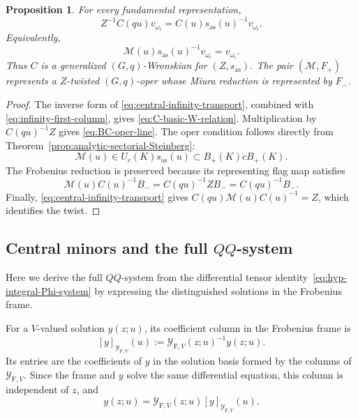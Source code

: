 \documentclass[11pt,leqno]{amsart}
\numberwithin{equation}{section}
\theoremstyle{plain}
\newtheorem{proposition}[theorem]{Proposition}
\theoremstyle{definition}
\theoremstyle{plain}
\theoremstyle{definition}
\theoremstyle{remark}
\begin{document}
\begin{proposition}\label{prop:one-step-differential-W}\label{prop:direct-qoper}
For every fundamental representation,
\begin{equation}\label{eq:C-basic-W-relation}
 Z^{-1}C(qu)v_{\omega_i}=C(u)s_{\mathrm{as}}(u)^{-1}v_{\omega_i}.
\end{equation}
Equivalently,
\begin{equation}\label{eq:BC-oper-line}
 \mathscr M(u)s_{\mathrm{as}}(u)^{-1}v_{\omega_i}=v_{\omega_i}.
\end{equation}
Thus $C$ is a generalized $(G,q)$-Wronskian for $(Z,s_{\mathrm{as}})$.  The pair $(\mathscr M,F_+)$ represents a $Z$-twisted $(G,q)$-oper whose Miura reduction is represented by $F_-$.
\end{proposition}
\begin{proof}
The inverse form of \eqref{eq:central-infinity-transport}, combined with \eqref{eq:infinity-first-column}, gives \eqref{eq:C-basic-W-relation}.  Multiplication by $C(qu)^{-1}Z$ gives \eqref{eq:BC-oper-line}.  The oper condition follows directly from Theorem~\ref{prop:analytic-sectorial-Steinberg}:
\[
 \mathscr M(u)\in U_c(K)s_{\mathrm{as}}(u)\subset B_+(K)\dot cB_+(K).
\]
The Frobenius reduction is preserved because its representing flag map satisfies
\[
 \mathscr M(u)C(u)^{-1}B_-=C(qu)^{-1}Z B_-=C(qu)^{-1}B_-.
\]
Finally, \eqref{eq:central-infinity-transport} gives $C(qu)\mathscr M(u)C(u)^{-1}=Z$, which identifies the twist.
\end{proof}

\subsection{Central minors and the full \texorpdfstring{$QQ$}{QQ}-system}
Here we derive the full $QQ$-system from the differential tensor identity~\eqref{eq:hyp-integral-Phi-system} by expressing the distinguished solutions in the Frobenius frame.

For a $V$-valued solution $y(z;u)$, its coefficient column in the Frobenius frame is
\[
 [y]_{\mathcal Y_{\mathrm F,V}}(u)
 :=\mathcal Y_{\mathrm F,V}(z;u)^{-1}y(z;u).
\]
Its entries are the coefficients of $y$ in the solution basis formed by the columns of $\mathcal Y_{\mathrm F,V}$.  Since the frame and $y$ solve the same differential equation, this column is independent of $z$, and
\[
 y(z;u)=\mathcal Y_{\mathrm F,V}(z;u)
              [y]_{\mathcal Y_{\mathrm F,V}}(u).
\]
\end{document}

